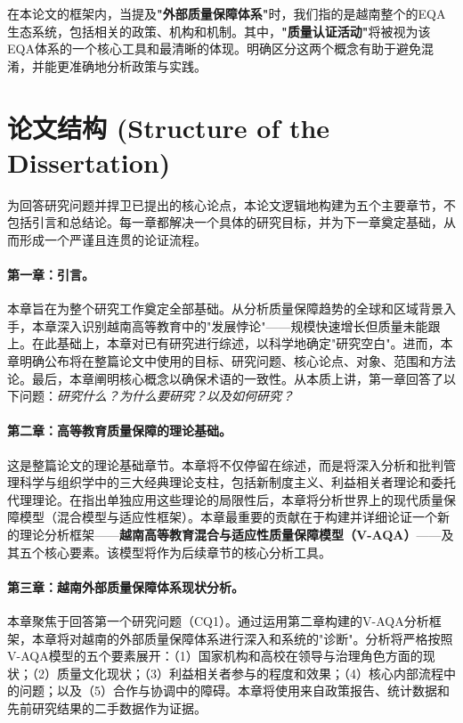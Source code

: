 在本论文的框架内，当提及\textbf{"外部质量保障体系"}时，我们指的是越南整个的EQA生态系统，包括相关的政策、机构和机制。其中，\textbf{"质量认证活动"}将被视为该EQA体系的一个核心工具和最清晰的体现。明确区分这两个概念有助于避免混淆，并能更准确地分析政策与实践。

\section{论文结构 (Structure of the Dissertation)}
\label{sec:cau_truc_luan_an}

为回答研究问题并捍卫已提出的核心论点，本论文逻辑地构建为五个主要章节，不包括引言和总结论。每一章都解决一个具体的研究目标，并为下一章奠定基础，从而形成一个严谨且连贯的论证流程。

\paragraph{第一章：引言。}
本章旨在为整个研究工作奠定全部基础。从分析质量保障趋势的全球和区域背景入手，本章深入识别越南高等教育中的"发展悖论"——规模快速增长但质量未能跟上。在此基础上，本章对已有研究进行综述，以科学地确定"研究空白"。进而，本章明确公布将在整篇论文中使用的目标、研究问题、核心论点、对象、范围和方法论。最后，本章阐明核心概念以确保术语的一致性。从本质上讲，第一章回答了以下问题：\textit{研究什么？为什么要研究？以及如何研究？}

\paragraph{第二章：高等教育质量保障的理论基础。}
这是整篇论文的理论基础章节。本章将不仅停留在综述，而是将深入分析和批判管理科学与组织学中的三大经典理论支柱，包括新制度主义、利益相关者理论和委托代理理论。在指出单独应用这些理论的局限性后，本章将分析世界上的现代质量保障模型（混合模型与适应性框架）。本章最重要的贡献在于构建并详细论证一个新的理论分析框架——\textbf{越南高等教育混合与适应性质量保障模型（V-AQA）}——及其五个核心要素。该模型将作为后续章节的核心分析工具。

\paragraph{第三章：越南外部质量保障体系现状分析。}
本章聚焦于回答第一个研究问题（CQ1）。通过运用第二章构建的V-AQA分析框架，本章将对越南的外部质量保障体系进行深入和系统的"诊断"。分析将严格按照V-AQA模型的五个要素展开：（1）国家机构和高校在领导与治理角色方面的现状；（2）质量文化现状；（3）利益相关者参与的程度和效果；（4）核心内部流程中的问题；以及（5）合作与协调中的障碍。本章将使用来自政策报告、统计数据和先前研究结果的二手数据作为证据。


